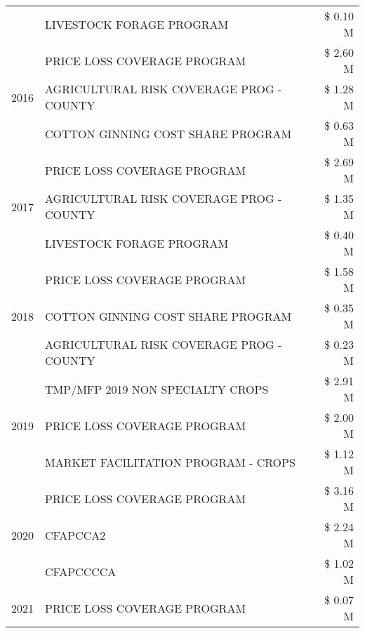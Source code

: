\begin{tabular}{llr}
 & LIVESTOCK FORAGE PROGRAM & \$ 0.10 M \\
\cline{1-3}
\multirow[t]{3}{*}{2016} & PRICE LOSS COVERAGE PROGRAM                   & \$ 2.60 M \\
 & AGRICULTURAL RISK COVERAGE PROG - COUNTY      & \$ 1.28 M \\
 & COTTON GINNING COST SHARE PROGRAM             & \$ 0.63 M \\
\cline{1-3}
\multirow[t]{3}{*}{2017} & PRICE LOSS COVERAGE PROGRAM & \$ 2.69 M \\
 & AGRICULTURAL RISK COVERAGE PROG - COUNTY & \$ 1.35 M \\
 & LIVESTOCK FORAGE PROGRAM & \$ 0.40 M \\
\cline{1-3}
\multirow[t]{3}{*}{2018} & PRICE LOSS COVERAGE PROGRAM & \$ 1.58 M \\
 & COTTON GINNING COST SHARE PROGRAM & \$ 0.35 M \\
 & AGRICULTURAL RISK COVERAGE PROG - COUNTY & \$ 0.23 M \\
\cline{1-3}
\multirow[t]{3}{*}{2019} & TMP/MFP 2019 NON SPECIALTY CROPS & \$ 2.91 M \\
 & PRICE LOSS COVERAGE PROGRAM & \$ 2.00 M \\
 & MARKET FACILITATION PROGRAM - CROPS & \$ 1.12 M \\
\cline{1-3}
\multirow[t]{3}{*}{2020} & PRICE LOSS COVERAGE PROGRAM & \$ 3.16 M \\
 & CFAPCCA2 & \$ 2.24 M \\
 & CFAPCCCCA & \$ 1.02 M \\
\cline{1-3}
2021 & PRICE LOSS COVERAGE PROGRAM & \$ 0.07 M \\
\cline{1-3}
\bottomrule
\end{tabular}
